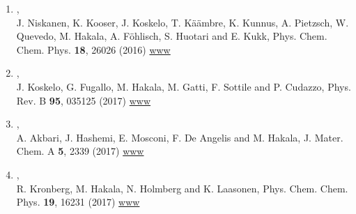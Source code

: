 \documentclass[12pt,a4]{report}
\begin{document}
\begin{enumerate}
\item{},\\
J. Niskanen, K. Kooser, J. Koskelo, T. K{\"a}{\"a}mbre, K. Kunnus, A. Pietzsch, W. Quevedo, M. Hakala, A. F{\"o}hlisch, S. Huotari and E. Kukk, Phys. Chem. Chem. Phys. {\bf 18}, 26026 (2016)
\href{http://pubs.rsc.org/en/Content/ArticleLanding/2016/CP/C6CP03220F#!divAbstract}{www}



\item{},\\
J. Koskelo, G. Fugallo, M. Hakala, M. Gatti, F. Sottile and P. Cudazzo, Phys. Rev. B {\bf 95}, 035125 (2017)
\href{http://journals.aps.org/prb/abstract/10.1103/PhysRevB.95.035125}{www}

\item{},\\
A. Akbari, J. Hashemi, E. Mosconi, F. De Angelis and M. Hakala, J. Mater. Chem. A {\bf 5}, 2339 (2017)
\href{http://pubs.rsc.org/en/content/articlelanding/2016/ta/c6ta08874k#!divAbstract}{www}

\item{},\\
R. Kronberg, M. Hakala, N. Holmberg and K. Laasonen, Phys. Chem. Chem. Phys. {\bf 19}, 16231 (2017)
\href{http://pubs.rsc.org/en/Content/ArticleLanding/2017/CP/C7CP03068A}{www}







\end{enumerate}
\end{document}
